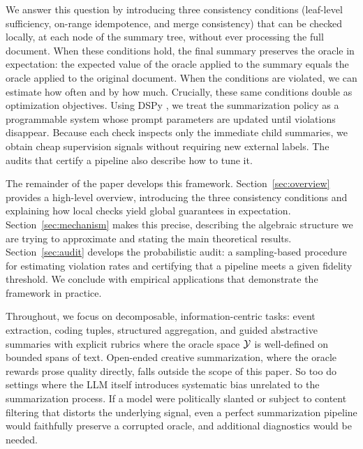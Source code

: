 We answer this question by introducing three consistency conditions (leaf-level sufficiency, on-range idempotence, and merge consistency) that can be checked locally, at each node of the summary tree, without ever processing the full document. When these conditions hold, the final summary preserves the oracle in expectation: the expected value of the oracle applied to the summary equals the oracle applied to the original document. When the conditions are violated, we can estimate how often and by how much. Crucially, these same conditions double as optimization objectives. Using DSPy \citep{khattab2024dspy}, we treat the summarization policy as a programmable system whose prompt parameters are updated until violations disappear. Because each check inspects only the immediate child summaries, we obtain cheap supervision signals without requiring new external labels. The audits that certify a pipeline also describe how to tune it.

The remainder of the paper develops this framework. Section~\ref{sec:overview} provides a high-level overview, introducing the three consistency conditions and explaining how local checks yield global guarantees in expectation. Section~\ref{sec:mechanism} makes this precise, describing the algebraic structure we are trying to approximate and stating the main theoretical results. Section~\ref{sec:audit} develops the probabilistic audit: a sampling-based procedure for estimating violation rates and certifying that a pipeline meets a given fidelity threshold. We conclude with empirical applications that demonstrate the framework in practice.

Throughout, we focus on decomposable, information-centric tasks: event extraction, coding tuples, structured aggregation, and guided abstractive summaries with explicit rubrics where the oracle space $\mathcal{Y}$ is well-defined on bounded spans of text. Open-ended creative summarization, where the oracle rewards prose quality directly, falls outside the scope of this paper. So too do settings where the LLM itself introduces systematic bias unrelated to the summarization process. If a model were politically slanted or subject to content filtering that distorts the underlying signal, even a perfect summarization pipeline would faithfully preserve a corrupted oracle, and additional diagnostics would be needed.
